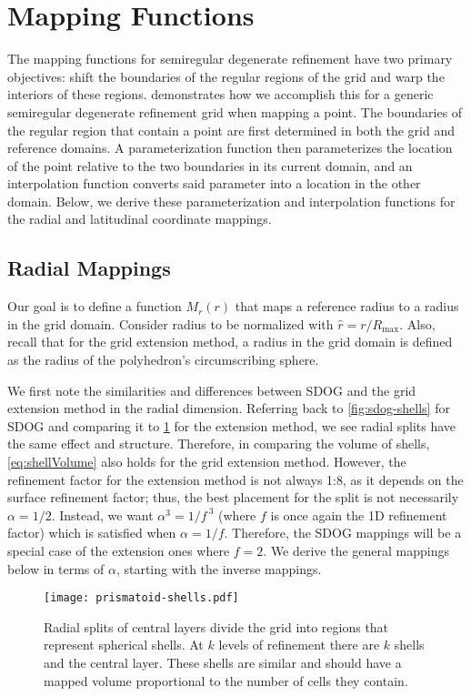 \section{Mapping Functions} \label{chap:6:functions}
The mapping functions for semiregular degenerate refinement have two primary objectives: shift the boundaries of the regular regions of the grid and warp the interiors of these regions.
 demonstrates how we accomplish this for a generic semiregular degenerate refinement grid when mapping a point.
The boundaries of the regular region that contain a point are first determined in both the grid and reference domains.
A parameterization function then parameterizes the location of the point relative to the two boundaries in its current domain, and an interpolation function converts said parameter into a location in the other domain.
Below, we derive these parameterization and interpolation functions for the radial and latitudinal coordinate mappings.


\subsection{Radial Mappings} \label{chap:6:radial}
Our goal is to define a function $M_r(r)$ that maps a reference radius to a radius in the grid domain.
Consider radius to be normalized with $\hat{r} = r / R_\mathrm{max}$.
Also, recall that for the grid extension method, a radius in the grid domain is defined as the radius of the polyhedron's circumscribing sphere.


We first note the similarities and differences between SDOG and the grid extension method in the radial dimension.
Referring back to \cref{fig:sdog-shells} for SDOG and comparing it to \cref{fig:prismatoid-shells} for the extension method, we see radial splits have the same effect and structure.
Therefore, in comparing the volume of shells, \cref{eq:shellVolume} also holds for the grid extension method.
However, the refinement factor for the extension method is not always 1:8, as it depends on the surface refinement factor; thus, the best placement for the split is not necessarily $\alpha = 1/2$.
Instead, we want $\alpha^3 = 1 / f^{\ 3}$ (where $f$ is once again the 1D refinement factor) which is satisfied when $\alpha = 1/f$.
Therefore, the SDOG mappings will be a special case of the extension ones where $f = 2$.
We derive the general mappings below in terms of $\alpha$, starting with the inverse mappings.


\begin{figure}[tb!]
	\centering
	\texttt{[image: prismatoid-shells.pdf]}
	\caption[Spherical shells that result from the grid extension method]{
		Radial splits of central layers divide the grid into regions that represent spherical shells.
		At $k$ levels of refinement there are $k$ shells and the central layer.
		These shells are similar and should have a mapped volume proportional to the number of cells they contain.
	}
	\label{fig:prismatoid-shells}
\end{figure}


